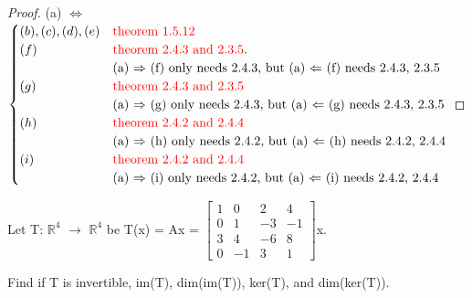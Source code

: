     \begin{proof}
        (a) $\Leftrightarrow$
        $\begin{cases}
            (b),(c),(d),(e) & {\color{red} \text{theorem 1.5.12}} \\
            (f) & {\color{red} \text{theorem 2.4.3 and 2.3.5}}. \\
                & \text{(a) $\Rightarrow$ (f) only needs 2.4.3,
                    but (a) $\Leftarrow$ (f) needs 2.4.3, 2.3.5} \\
            (g) & {\color{red} \text{theorem 2.4.3 and 2.3.5}} \\
                & \text{(a) $\Rightarrow$ (g) only needs 2.4.3,
                    but (a) $\Leftarrow$ (g) needs 2.4.3, 2.3.5} \\
            (h) & {\color{red} \text{theorem 2.4.2 and 2.4.4}} \\
                & \text{(a) $\Rightarrow$ (h) only needs 2.4.2,
                    but (a) $\Leftarrow$ (h) needs 2.4.2, 2.4.4} \\
            (i) & {\color{red} \text{theorem 2.4.2 and 2.4.4}} \\
                & \text{(a) $\Rightarrow$ (i) only needs 2.4.2,
                    but (a) $\Leftarrow$ (i) needs 2.4.2, 2.4.4} \\
        \end{cases}$
    \end{proof}

    \newpage



    \begin{example}
        Let T: $\mathbb{R}^4$ $\rightarrow$ $\mathbb{R}^4$
        be T(x) = Ax =
        $\begin{bmatrix}
            1 & 0 & 2 & 4 \\
            0 & 1 & -3 & -1 \\
            3 & 4 & -6 & 8 \\
            0 & -1 & 3 & 1
        \end{bmatrix}$x.

        Find if T is invertible, im(T), dim(im(T)), ker(T), and dim(ker(T)).
    \end{example}

